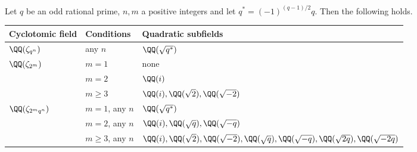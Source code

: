 \begin{lemma}\label{lem_subfields}
    Let $q$ be an odd rational prime, $n,m$ a positive integers and let $q^*=(-1)^{(q-1)/2}q$. Then the following holds.

    \begin{table}[!ht]
        \centering
        \begin{tabular}{|l|l|l|}
        \hline
        Cyclotomic field                    & Conditions & Quadratic subfields                   \\ \hline
        $\QQ(\zeta_{q^n})$                  & any $n$    & $\QQ(\sqrt{q^*})$            \\ \hline
        \multirow{3}{*}{$\QQ(\zeta_{2^m})$} & $m=1$      & none                                  \\ \cline{2-3} 
                                            & $m=2$      & $\QQ(i)$                              \\ \cline{2-3} 
                                            & $m\geq3$   & $\QQ(i),\QQ(\sqrt{2}),\QQ(\sqrt{-2})$ \\ \hline
        \multirow{3}{*}{$\QQ(\zeta_{2^mq^n})$}  & $m=1$, any $n$      & $\QQ(\sqrt{q^*})$     \\ \cline{2-3} 
                                            & $m=2$, any $n$      & $\QQ(i),\QQ(\sqrt{q}),\QQ(\sqrt{-q})$                              \\ \cline{2-3}
                                            & $m\geq 3$, any $n$      & $\QQ(i),\QQ(\sqrt{2}),\QQ(\sqrt{-2}),\QQ(\sqrt{q}),\QQ(\sqrt{-q}),\QQ(\sqrt{2q}),\QQ(\sqrt{-2q})$                              \\ 
                                             \hline
        \end{tabular}
        \end{table}

\end{lemma}

